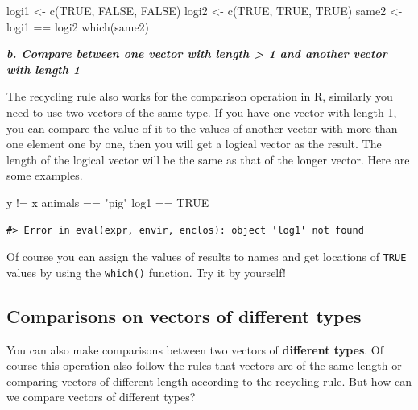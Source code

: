 \documentclass[
]{book}
\newenvironment{Shaded}{\begin{snugshade}}{\end{snugshade}}
\newcommand{\ConstantTok}[1]{\textcolor[rgb]{0.00,0.00,0.00}{#1}}
\newcommand{\FunctionTok}[1]{\textcolor[rgb]{0.00,0.00,0.00}{#1}}
\newcommand{\NormalTok}[1]{#1}
\newcommand{\OtherTok}[1]{\textcolor[rgb]{0.56,0.35,0.01}{#1}}
\newcommand{\SpecialCharTok}[1]{\textcolor[rgb]{0.00,0.00,0.00}{#1}}
\newcommand{\StringTok}[1]{\textcolor[rgb]{0.31,0.60,0.02}{#1}}
\begin{document}
\begin{Shaded}
\begin{Highlighting}[]
\NormalTok{logi1 }\OtherTok{\textless{}{-}} \FunctionTok{c}\NormalTok{(}\ConstantTok{TRUE}\NormalTok{, }\ConstantTok{FALSE}\NormalTok{, }\ConstantTok{FALSE}\NormalTok{)     }
\NormalTok{logi2 }\OtherTok{\textless{}{-}} \FunctionTok{c}\NormalTok{(}\ConstantTok{TRUE}\NormalTok{, }\ConstantTok{TRUE}\NormalTok{, }\ConstantTok{TRUE}\NormalTok{)}
\NormalTok{same2 }\OtherTok{\textless{}{-}}\NormalTok{ logi1 }\SpecialCharTok{==}\NormalTok{ logi2}
\FunctionTok{which}\NormalTok{(same2)}
\end{Highlighting}
\end{Shaded}

\textbf{\emph{b. Compare between one vector with length \textgreater{} 1 and another vector with length 1}}

The recycling rule also works for the comparison operation in R, similarly you need to use two vectors of the same type. If you have one vector with length 1, you can compare the value of it to the values of another vector with more than one element one by one, then you will get a logical vector as the result. The length of the logical vector will be the same as that of the longer vector. Here are some examples.

\begin{Shaded}
\begin{Highlighting}[]
\NormalTok{y }\SpecialCharTok{!=}\NormalTok{ x}
\NormalTok{animals }\SpecialCharTok{==} \StringTok{"pig"}
\NormalTok{log1 }\SpecialCharTok{==} \ConstantTok{TRUE}
\end{Highlighting}
\end{Shaded}

\begin{verbatim}
#> Error in eval(expr, envir, enclos): object 'log1' not found
\end{verbatim}

Of course you can assign the values of results to names and get locations of \texttt{TRUE} values by using the \texttt{which()} function. Try it by yourself!

\hypertarget{comparisons-on-vectors-of-different-types}{%
\subsection{Comparisons on vectors of different types}\label{comparisons-on-vectors-of-different-types}}

You can also make comparisons between two vectors of \textbf{different types}. Of course this operation also follow the rules that vectors are of the same length or comparing vectors of different length according to the recycling rule. But how can we compare vectors of different types?
\end{document}
